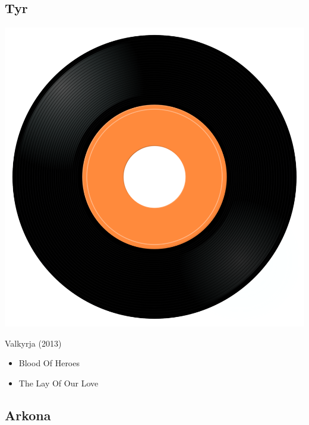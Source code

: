 \subsection{Tyr}

\begin{minipage}[t]{0.25\textwidth}
\captionsetup{type=figure}
\includegraphics[width=\textwidth]{Images/cover.png}
\caption*{Valkyrja (2013)}
\end{minipage}
\begin{minipage}[t]{0.25\textwidth}\vspace{0pt}
\begin{itemize}[nosep,leftmargin=1em,labelwidth=*,align=left]
	\setlength{\itemsep}{0pt}
	\item Blood Of Heroes
	\item The Lay Of Our Love
\end{itemize}
\end{minipage}

\subsection{Arkona}

